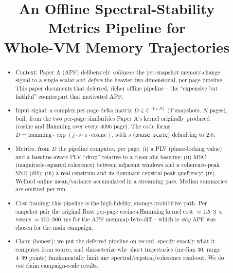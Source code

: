 \documentclass[conference]{IEEEtran}
\title{An Offline Spectral-Stability Metrics Pipeline for\\
Whole-VM Memory Trajectories}
\author{\IEEEauthorblockN{TODO Author list}
\IEEEauthorblockA{TODO Affiliation\\
\texttt{TODO@email}}}
\begin{document}
\maketitle

\begin{abstract}
\begin{itemize}
  \item Context: Paper A (APF) deliberately \emph{collapses} the per-snapshot
        memory-change signal to a single scalar and \emph{defers} the heavier
        two-dimensional, per-page pipeline. This paper documents that deferred,
        richer offline pipeline -- the ``expensive but faithful'' counterpart
        that motivated APF.
  \item Input signal: a complex per-page delta matrix
        $D \in \mathbb{C}^{[T \times N]}$ ($T$ snapshots, $N$ pages), built from
        the two per-page similarities Paper A's kernel originally produced
        (cosine and Hamming over every \SI{4096}{\byte} page). The code forms
        $D = \mathrm{hamming}\cdot\exp(j\cdot s\cdot\pi\cdot\mathrm{cosine})$,
        with $s$ (\texttt{phase\_scale}) defaulting to $2.0$.
  \item Metrics: from $D$ the pipeline computes, per page, (i) a PLV
        (phase-locking value) and a baseline-aware PLV ``drop'' relative to a
        clean idle baseline; (ii) MSC (magnitude-squared coherence) between
        adjacent windows and a coherence-peak SNR (dB); (iii) a real cepstrum
        and its dominant cepstral-peak quefrency; (iv) Welford online
        mean/variance accumulated in a streaming pass. Median summaries are
        emitted per run.
  \item Cost framing: this pipeline is the high-fidelity, storage-prohibitive
        path. Per snapshot pair the original Rust per-page cosine+Hamming kernel
        cost $\approx$\SI{1.5}{}--\SI{3}{\second}, versus
        $\approx$\SI{300}{}--\SI{500}{\milli\second} for the APF memmap
        byte-diff -- which is \emph{why} APF was chosen for the main campaign.
  \item Claim (honest): we put the deferred pipeline on record, specify exactly
        what it computes from source, and characterize why short trajectories
        (median \num{30}, range \numrange{4}{99} points) fundamentally limit any
        spectral/cepstral/coherence read-out. We do \emph{not} claim
        campaign-scale results.
\end{itemize}
\end{abstract}
\end{document}
